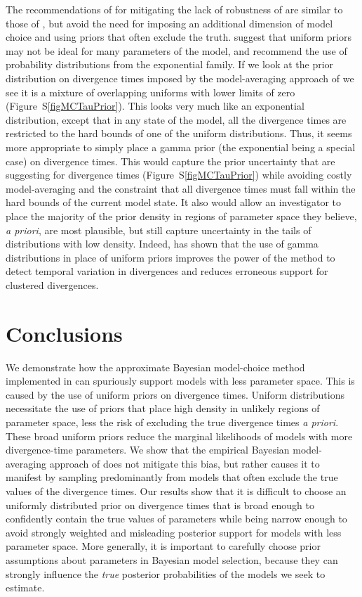 The recommendations of \citet{Oaks2012} for mitigating the lack of robustness
of \msb are similar to those of \citet{Hickerson2013}, but avoid the need for
imposing an additional dimension of model choice and using priors that often
exclude the truth.
\citet{Oaks2012} suggest that uniform priors may not be ideal for many
parameters of the \msb model, and recommend the use of probability
distributions from the exponential family.
If we look at the prior distribution on divergence times imposed by
the model-averaging approach of \citet{Hickerson2013} we see it is a mixture of
overlapping uniforms with lower limits of zero (Figure~S\ref{figMCTauPrior}).
This looks very much like an exponential distribution, except that in any state
of the model, all the divergence times are restricted to the hard
bounds of one of the uniform distributions.
Thus, it seems more appropriate to simply place a gamma prior (the exponential
being a special case) on divergence times.
This would capture the prior uncertainty that \citet{Hickerson2013} are
suggesting for divergence times (Figure~S\ref{figMCTauPrior}) while avoiding
costly model-averaging and the constraint that all divergence times must fall
within the hard bounds of the current model state.
It also would allow an investigator to place the majority of the prior density
in regions of parameter space they believe, \emph{a priori}, are most
plausible, but still capture uncertainty in the tails of distributions with low
density.
Indeed, \citet{Oaks2014dpp} has shown that the use of gamma distributions in
place of uniform priors improves the power of the method to detect temporal
variation in divergences and reduces erroneous support for clustered
divergences.


\section{Conclusions}
We demonstrate how the approximate Bayesian model-choice method implemented in
\msb can spuriously support models with less parameter space.
This is caused by the use of uniform priors on divergence times.
Uniform distributions necessitate the use of priors that place high density in
unlikely regions of parameter space, less the risk of excluding the true
divergence times \emph{a priori}.
These broad uniform priors reduce the marginal likelihoods of models with more
divergence-time parameters.
We show that the empirical Bayesian model-averaging approach of
\citet{Hickerson2013} does not mitigate this bias, but rather causes it to
manifest by sampling predominantly from models that often exclude the true
values of the divergence times.
Our results show that it is difficult to choose an uniformly distributed prior
on divergence times that is broad enough to confidently contain the true values
of parameters while being narrow enough to avoid strongly weighted and
misleading posterior support for models with less parameter space.
More generally, it is important to carefully choose prior assumptions about
parameters in Bayesian model selection, because they can strongly influence the
\emph{true} posterior probabilities of the models we seek to estimate.


